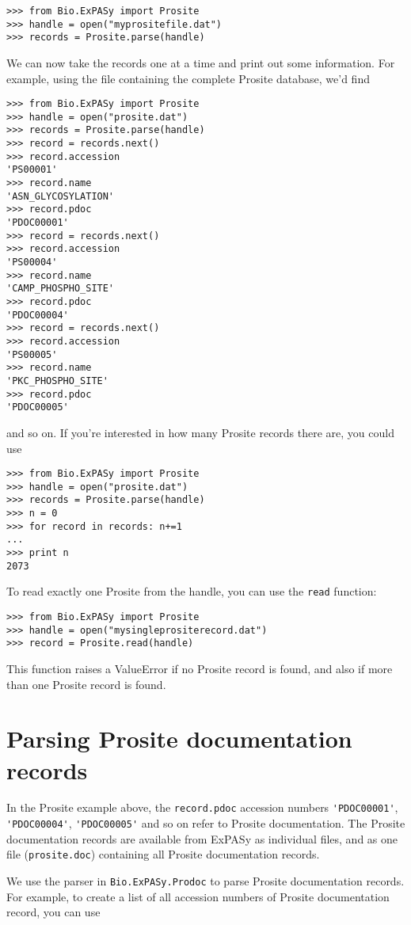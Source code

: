 \documentclass{report}
\begin{document}
\begin{verbatim}
>>> from Bio.ExPASy import Prosite
>>> handle = open("myprositefile.dat")
>>> records = Prosite.parse(handle)
\end{verbatim}

We can now take the records one at a time and print out some information. For example, using the file containing the complete Prosite database, we'd find
\begin{verbatim}
>>> from Bio.ExPASy import Prosite
>>> handle = open("prosite.dat")
>>> records = Prosite.parse(handle)
>>> record = records.next()
>>> record.accession
'PS00001'
>>> record.name
'ASN_GLYCOSYLATION'
>>> record.pdoc
'PDOC00001'
>>> record = records.next()
>>> record.accession
'PS00004'
>>> record.name
'CAMP_PHOSPHO_SITE'
>>> record.pdoc
'PDOC00004'
>>> record = records.next()
>>> record.accession
'PS00005'
>>> record.name
'PKC_PHOSPHO_SITE'
>>> record.pdoc
'PDOC00005'
\end{verbatim}
and so on. If you're interested in how many Prosite records there are, you could use
\begin{verbatim}
>>> from Bio.ExPASy import Prosite
>>> handle = open("prosite.dat")
>>> records = Prosite.parse(handle)
>>> n = 0
>>> for record in records: n+=1
...
>>> print n
2073
\end{verbatim}

To read exactly one Prosite from the handle, you can use the \verb|read| function:
\begin{verbatim}
>>> from Bio.ExPASy import Prosite
>>> handle = open("mysingleprositerecord.dat")
>>> record = Prosite.read(handle)
\end{verbatim}
This function raises a ValueError if no Prosite record is found, and also if more than one Prosite record is found.

\section{Parsing Prosite documentation records}

In the Prosite example above, the \verb|record.pdoc| accession numbers \verb|'PDOC00001'|, \verb|'PDOC00004'|, \verb|'PDOC00005'| and so on refer to Prosite documentation. The Prosite documentation records are available from ExPASy as individual files, and as one file (\verb|prosite.doc|) containing all Prosite documentation records.

We use the parser in \verb|Bio.ExPASy.Prodoc| to parse Prosite documentation records. For example, to create a list of all accession numbers of Prosite documentation record, you can use
\end{document}
